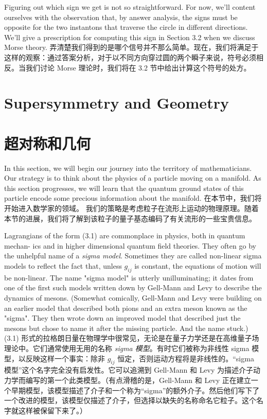 \documentclass{article}
\begin{document}
\begin{paracol}{2}
Figuring out which sign we get is not so straightforward. For now, we’ll content ourselves with the observation that, by answer analysis, the signs must be opposite for the two instantons that traverse the circle in diﬀerent directions. We’ll give a prescription for computing this sign in Section 3.2 when we discuss Morse theory.
\switchcolumn
弄清楚我们得到的是哪个信号并不那么简单。现在，我们将满足于这样的观察：通过答案分析，对于以不同方向穿过圆的两个瞬子来说，符号必须相反。当我们讨论 Morse 理论时，我们将在 3.2 节中给出计算这个符号的处方。
\switchcolumn*

\section{Supersymmetry and Geometry}
\switchcolumn
\section*{超对称和几何}
\switchcolumn*

In this section, we will begin our journey into the territory of mathematicians. Our strategy is to think about the physics of a particle moving on a manifold. As this section progresses, we will learn that the quantum ground states of this particle encode some precious information about the manifold.
\switchcolumn
在本节中，我们将开始进入数学家的领域。 我们的策略是考虑粒子在流形上运动的物理原理。随着本节的进展，我们将了解到该粒子的量子基态编码了有关流形的一些宝贵信息。
\switchcolumn*

Lagrangians of the form (3.1) are commonplace in physics, both in quantum mechan- ics and in higher dimensional quantum field theories. They often go by the unhelpful name of a \textit{sigma model}. Sometimes they are called non-linear sigma models to reﬂect the fact that, unless $g_{ij}$ is constant, the equations of motion will be non-linear. The name "sigma model" is utterly unilluminating; it dates from one of the first such models written down by Gell-Mann and Levy to describe the dynamics of mesons. (Somewhat comically, Gell-Mann and Levy were building on an earlier model that described both pions and an extra meson known as the "sigma". They then wrote down an improved model that described just the mesons but chose to name it after the missing particle. And the name stuck.)
\switchcolumn
(3.1) 形式的拉格朗日量在物理学中很常见，无论是在量子力学还是在高维量子场理论中。它们通常使用无用的名称 \textit{sigma 模型}。有时它们被称为非线性 sigma 模型，以反映这样一个事实：除非 $g_{ij}$ 恒定，否则运动方程将是非线性的。“sigma 模型”这个名字完全没有启发性。它可以追溯到 Gell-Mann 和 Levy 为描述介子动力学而编写的第一个此类模型。（有点滑稽的是，Gell-Mann 和 Levy 正在建立一个早期模型，该模型描述了介子和一个称为“sigma”的额外介子。然后他们写下了一个改进的模型，该模型仅描述了介子，但选择以缺失的名称命名它粒子。这个名字就这样被保留下来了。）
\switchcolumn*


\end{paracol}
\end{document}
